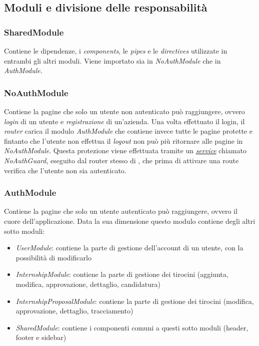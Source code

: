 \subsection{Moduli e divisione delle responsabilità}
\label{client:modules}
\subsubsection{SharedModule}
\label{client:shared-module}
Contiene le dipendenze, i \textit{components}, le \textit{pipes} e le \textit{directives} utilizzate in entrambi gli altri moduli. Viene importato sia in \textit{NoAuthModule} che in \textit{AuthModule}.

\subsubsection{NoAuthModule}
\label{client:no-auth-module}
Contiene la pagine che solo un utente non autenticato può raggiungere, ovvero \textit{login} di un utente e \textit{registrazione} di un'azienda. Una volta effettuato il login, il \textit{router} carica il modulo \textit{AuthModule} che contiene invece tutte le pagine protette e fintanto che l'utente non effettua il \textit{logout} non può più ritornare alle pagine in \textit{NoAuthModule}. Questa protezione viene effettuata tramite un \hyperref[chap:client:services]{\textit{service}} chiamato \textit{NoAuthGuard}, eseguito dal router stesso di \angular, che prima di attivare una route verifica che l'utente non sia autenticato.


\subsubsection{AuthModule}
\label{client:auth-module}
Contiene la pagine che solo un utente autenticato può raggiungere, ovvero il cuore dell'applicazione. Data la sua dimensione questo modulo contiene degli altri sotto moduli:
\begin{itemize}
	\item \textit{UserModule}: contiene la parte di gestione dell'account di un utente, con la possibilità di modificarlo
	\item \textit{InternshipModule}: contiene la parte di gestione dei tirocini (aggiunta, modifica, approvazione, dettaglio, candidatura)
	\item \textit{InternshipProposalModule}: contiene la parte di gestione dei tirocini (modifica, approvazione, dettaglio, tracciamento)
	\item \textit{SharedModule}: contiene i componenti comuni a questi sotto moduli (header, footer e sidebar)
\end{itemize}

